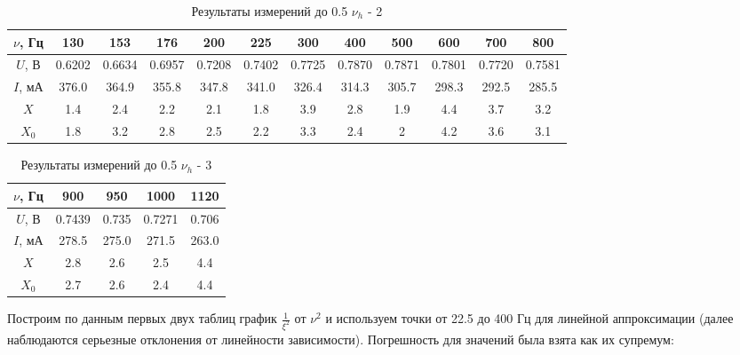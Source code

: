 \documentclass[a4paper,12pt]{article} %
\begin{document}
\begin{table}[H]
	\centering
	\begin{tabular}{|c|c|c|c|c|c|c|c|c|c|c|c|}
		\hline
		$ \nu $, Гц   & 130   & 153   & 176   & 200   & 225   & 300 & 400 & 500 & 600 & 700 & 800 \\ \hline
		$ U $, В & 0.6202 & 0.6634 & 0.6957 & 0.7208 & 0.7402 & 0.7725 & 0.7870 & 0.7871 & 0.7801 & 0.7720 & 0.7581 \\ \hline
		$ I $, мА & 376.0 & 364.9 & 355.8 & 347.8 & 341.0 & 326.4 & 314.3 & 305.7 & 298.3 & 292.5 & 285.5 \\ \hline
		$ X $  & 1.4 & 2.4 & 2.2 & 2.1 & 1.8 & 3.9 & 2.8 & 1.9 & 4.4 & 3.7 & 3.2 \\ \hline
		$ X_0 $  & 1.8 & 3.2 & 2.8 & 2.5 & 2.2 & 3.3 & 2.4 & 2 & 4.2 & 3.6 & 3.1 \\ \hline
	\end{tabular}
	\caption{Результаты измерений до 0.5 $\nu_h$ - 2}
	\label{tab:my-table1}
\end{table}

\begin{table}[H]
	\centering
	\begin{tabular}{|c|c|c|c||c|}
		\hline
		$ \nu $, Гц   & 900   & 950   & 1000 & 1120 \\ \hline
		$ U $, В & 0.7439 & 0.735 & 0.7271 & 0.706 \\ \hline
		$ I $, мА & 278.5 & 275.0 & 271.5 & 263.0 \\ \hline
		$ X $  & 2.8 & 2.6 & 2.5 & 4.4  \\ \hline
		$ X_0 $  & 2.7 & 2.6 & 2.4 & 4.4 \\ \hline
	\end{tabular}
	\caption{Результаты измерений до 0.5 $\nu_h$ - 3}
	\label{tab:my-table1}
\end{table}

Построим по данным первых двух таблиц график $\frac{1}{\xi^2}$ от $\nu^2$ и используем точки от 22.5 до 400 Гц для линейной аппроксимации (далее наблюдаются серьезные отклонения от линейности зависимости). Погрешность для значений была взята как их супремум:
\end{document}
